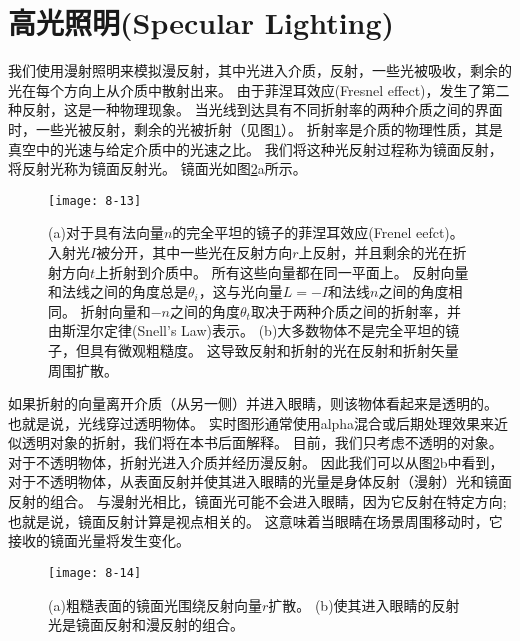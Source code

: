 \section{高光照明(Specular Lighting)}
\begin{flushleft}
我们使用漫射照明来模拟漫反射，其中光进入介质，反射，一些光被吸收，剩余的光在每个方向上从介质中散射出来。 由于菲涅耳效应(Fresnel effect)，发生了第二种反射，这是一种物理现象。 当光线到达具有不同折射率的两种介质之间的界面时，一些光被反射，剩余的光被折射（见图\ref{fig:8-13}）。 折射率是介质的物理性质，其是真空中的光速与给定介质中的光速之比。 我们将这种光反射过程称为镜面反射，将反射光称为镜面反射光。 镜面光如图\ref{fig:8-14}a所示。
\end{flushleft}

\begin{figure}[h]
    \label{fig:8-13}
    \texttt{[image: 8-13]}
    \centering
    \caption{(a)对于具有法向量$n$的完全平坦的镜子的菲涅耳效应(Frenel eefct)。 入射光$I$被分开，其中一些光在反射方向$r$上反射，并且剩余的光在折射方向$t$上折射到介质中。 所有这些向量都在同一平面上。 反射向量和法线之间的角度总是$θ_{i}$，这与光向量$L=-I$和法线$n$之间的角度相同。 折射向量和$-n$之间的角度$θ_{t}$取决于两种介质之间的折射率，并由斯涅尔定律(Snell's Law)表示。 (b)大多数物体不是完全平坦的镜子，但具有微观粗糙度。 这导致反射和折射的光在反射和折射矢量周围扩散。}
\end{figure}

\begin{flushleft}
如果折射的向量离开介质（从另一侧）并进入眼睛，则该物体看起来是透明的。 也就是说，光线穿过透明物体。 实时图形通常使用alpha混合或后期处理效果来近似透明对象的折射，我们将在本书后面解释。 目前，我们只考虑不透明的对象。\\
对于不透明物体，折射光进入介质并经历漫反射。 因此我们可以从图\ref{fig:8-14}b中看到，对于不透明物体，从表面反射并使其进入眼睛的光量是身体反射（漫射）光和镜面反射的组合。 与漫射光相比，镜面光可能不会进入眼睛，因为它反射在特定方向; 也就是说，镜面反射计算是视点相关的。 这意味着当眼睛在场景周围移动时，它接收的镜面光量将发生变化。\\
\end{flushleft}

\begin{figure}[h]
    \label{fig:8-14}
    \texttt{[image: 8-14]}
    \centering
    \caption{(a)粗糙表面的镜面光围绕反射向量$r$扩散。 (b)使其进入眼睛的反射光是镜面反射和漫反射的组合。}
\end{figure}


